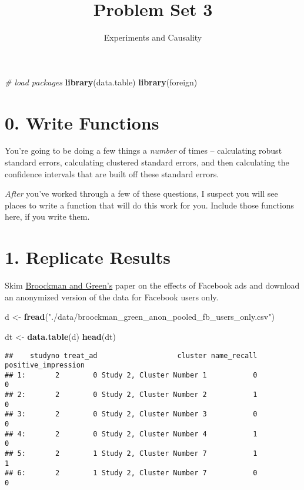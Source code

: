 \documentclass[
]{article}
\title{Problem Set 3}
\author{Experiments and Causality}
\date{}
\newenvironment{Shaded}{\begin{snugshade}}{\end{snugshade}}
\newcommand{\CommentTok}[1]{\textcolor[rgb]{0.56,0.35,0.01}{\textit{#1}}}
\newcommand{\KeywordTok}[1]{\textcolor[rgb]{0.13,0.29,0.53}{\textbf{#1}}}
\newcommand{\NormalTok}[1]{#1}
\newcommand{\StringTok}[1]{\textcolor[rgb]{0.31,0.60,0.02}{#1}}
\begin{document}
\maketitle

\begin{Shaded}
\begin{Highlighting}[]
\CommentTok{# load packages }
\KeywordTok{library}\NormalTok{(data.table)}
\KeywordTok{library}\NormalTok{(foreign)}
\end{Highlighting}
\end{Shaded}

\hypertarget{write-functions}{%
\section{0. Write Functions}\label{write-functions}}

You're going to be doing a few things a \emph{number} of times --
calculating robust standard errors, calculating clustered standard
errors, and then calculating the confidence intervals that are built off
these standard errors.

\emph{After} you've worked through a few of these questions, I suspect
you will see places to write a function that will do this work for you.
Include those functions here, if you write them.

\hypertarget{replicate-results}{%
\section{1. Replicate Results}\label{replicate-results}}

Skim \href{./readings/brookman_green_ps3.pdf}{Broockman and Green's}
paper on the effects of Facebook ads and download an anonymized version
of the data for Facebook users only.

\begin{Shaded}
\begin{Highlighting}[]
\NormalTok{d <-}\StringTok{ }\KeywordTok{fread}\NormalTok{(}\StringTok{"./data/broockman_green_anon_pooled_fb_users_only.csv"}\NormalTok{)}

\NormalTok{dt <-}\StringTok{ }\KeywordTok{data.table}\NormalTok{(d)}
\KeywordTok{head}\NormalTok{(dt)}
\end{Highlighting}
\end{Shaded}

\begin{verbatim}
##    studyno treat_ad                   cluster name_recall positive_impression
## 1:       2        0 Study 2, Cluster Number 1           0                   0
## 2:       2        0 Study 2, Cluster Number 2           1                   0
## 3:       2        0 Study 2, Cluster Number 3           0                   0
## 4:       2        0 Study 2, Cluster Number 4           1                   0
## 5:       2        1 Study 2, Cluster Number 7           1                   1
## 6:       2        1 Study 2, Cluster Number 7           0                   0
\end{verbatim}
\end{document}
